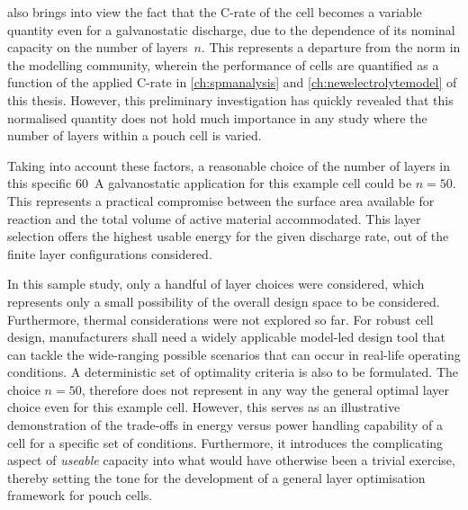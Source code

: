 

  also brings  into view  the fact  that the
\mbox{C-rate} of the  cell becomes a variable quantity even  for a galvanostatic
discharge,  due to  the dependence  of  its nominal  capacity on  the number  of
layers~$n$.  This  represents  a  departure  from  the  norm  in  the  modelling
community, wherein the performance of cells  are quantified as a function of the
applied C-rate \eg{}  in \cref{ch:spmanalysis} and \cref{ch:newelectrolytemodel}
of this  thesis. However,  this preliminary  investigation has  quickly revealed
that this normalised  quantity does not hold much importance  in any study where
the number of layers within a pouch cell is varied.

Taking into account  these factors, a reasonable choice of  the number of layers
in  this specific  \SI{60}{\ampere} galvanostatic  application for  this example
cell  could  be $n=50$.  This  represents  a  practical compromise  between  the
surface area  available for  reaction and  the total  volume of  active material
accommodated.  This layer  selection offers  the highest  usable energy  for the
given discharge rate, out of the finite layer configurations considered.

In this  sample study, only  a handful of  layer choices were  considered, which
represents  only  a  small  possibility  of  the  overall  design  space  to  be
considered. Furthermore,  thermal considerations were  not explored so  far. For
robust  cell design,  manufacturers  shall need  a  widely applicable  model-led
design tool that  can tackle the wide-ranging possible scenarios  that can occur
in real-life operating conditions. A deterministic set of optimality criteria is
also to  be formulated. The choice  $n=50$, therefore does not  represent in any
way the general  optimal layer choice even for this  example cell. However, this
serves as an illustrative demonstration of the trade-offs in energy versus power
handling capability of a cell for  a specific set of conditions. Furthermore, it
introduces the  complicating aspect of  \emph{useable} capacity into  what would
have  otherwise been  a  trivial  exercise, thereby  setting  the  tone for  the
development of a general layer optimisation framework for pouch cells.

